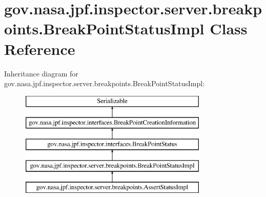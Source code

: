 \hypertarget{classgov_1_1nasa_1_1jpf_1_1inspector_1_1server_1_1breakpoints_1_1_break_point_status_impl}{}\section{gov.\+nasa.\+jpf.\+inspector.\+server.\+breakpoints.\+Break\+Point\+Status\+Impl Class Reference}
\label{classgov_1_1nasa_1_1jpf_1_1inspector_1_1server_1_1breakpoints_1_1_break_point_status_impl}
Inheritance diagram for gov.\+nasa.\+jpf.\+inspector.\+server.\+breakpoints.\+Break\+Point\+Status\+Impl\+:\begin{figure}[H]
\begin{center}
\leavevmode
\includegraphics[height=5.000000cm]{classgov_1_1nasa_1_1jpf_1_1inspector_1_1server_1_1breakpoints_1_1_break_point_status_impl}
\end{center}
\end{figure}
